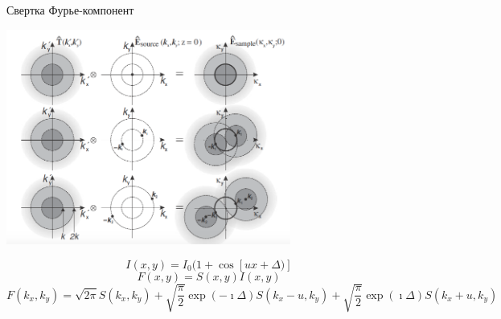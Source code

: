 \documentclass[9pt, compress, xcolor=table]{beamer}
\begin{document}
\begin{frame}{Свертка Фурье-компонент}
\begin{center}
\includegraphics[width=0.7\textwidth]{ffm16}

\begin{equation*}
I(x,y) = I_0
(1+\cos [u x+\Delta)]
\end{equation*}
\begin{equation*}
F(x,y)=S(x,y) I(x,y)
\end{equation*}
\begin{equation*}
F(k_x,k_y)=\sqrt{2\pi} S(k_x,k_y)+\sqrt{\frac{\pi}{2}}\exp(-\imath \Delta)S(k_x-u,k_y)+\sqrt{\frac{\pi}{2}}\exp(\imath \Delta)S(k_x+u,k_y)
\end{equation*}

\end{center}
\end{frame}
\end{document}
